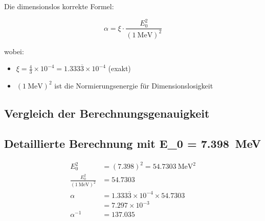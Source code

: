 	Die dimensionslos korrekte Formel:
	
	\begin{equation}
		\alpha = \xi \cdot \frac{E_0^2}{( \SI{1}{\MeV} )^2}
	\end{equation}
	
	wobei:
	\begin{itemize}
		\item $\xi = \frac{4}{3} \times 10^{-4} = 1.333\overline{3} \times 10^{-4}$ (exakt)
		\item $( \SI{1}{\MeV} )^2$ ist die Normierungsenergie für Dimensionslosigkeit
	\end{itemize}
	
	\subsection{Vergleich der Berechnungsgenauigkeit}
	
	\begin{table}[h]
		\centering
		\caption{Vergleich der Berechnungsgenauigkeit für verschiedene E\_0-Werte}
	\end{table}
	
	\subsection{Detaillierte Berechnung mit E\_0 = \SI{7.398}{\MeV}}
	
	\begin{align}
		E_0^2 &= (7.398)^2 = \SI{54.7303}{\MeV\squared} \\
		\frac{E_0^2}{( \SI{1}{\MeV} )^2} &= 54.7303 \\
		\alpha &= 1.333\overline{3} \times 10^{-4} \times 54.7303 \\
		&= 7.297 \times 10^{-3} \\
		\alpha^{-1} &= 137.035
	\end{align}
	
